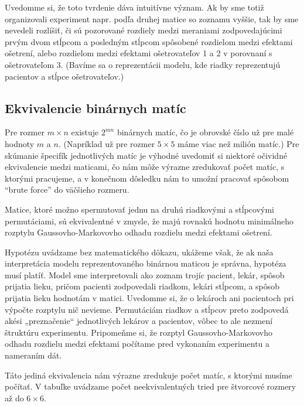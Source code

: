 Uvedomme si, že toto tvrdenie dáva intuitívne význam. Ak by sme totiž organizovali experiment napr. podľa druhej matice so zoznamu vyššie, 
tak by sme nevedeli rozlíšiť, či sú pozorované rozdiely medzi meraniami zodpovedajúcimi prvým dvom stĺpcom a posledným stĺpcom spôsobené rozdielom medzi efektami ošetrení, 
alebo rozdielom medzi efektami ošetrovateľov 1 a 2 v porovnaní s ošetrovateľom 3. (Bavíme sa o reprezentácii modelu, kde riadky reprezentujú pacientov a stĺpce ošetrovateľov.)

\subsection{Ekvivalencie binárnych matíc}

Pre rozmer $m \times n$ existuje $2^{mn}$ binárnych matíc, čo je obrovské číslo už pre malé hodnoty $m$ a $n$.
(Napríklad už pre rozmer $5 \times 5$ máme viac než milión matíc.)
Pre skúmanie špecifík jednotlivých matíc je výhodné uvedomiť si niektoré očividné ekvivalencie medzi maticami, 
čo nám môže výrazne zredukovať počet matíc, s ktorými pracujeme,
 a v konečnom dôsledku nám to umožní pracovať spôsobom “brute force” do väčšieho rozmeru.

\begin{hypoteza}

Matice, ktoré možno spermutovať jednu na druhú riadkovými a stĺpcovými permutáciami, sú ekvivalentné v zmysle, 
že majú rovnakú hodnotu minimálneho rozptylu Gaussovho-Markovovho odhadu rozdielu medzi efektami ošetrení.

\end{hypoteza}

Hypotézu uvádzame bez matematického dôkazu, ukážeme však, že ak naša interpretácia modelu reprezentovaného binárnou maticou je správna,
hypotéza musí platíť. Model sme interpretovali ako zoznam trojíc pacient, lekár, spôsob prijatia lieku, 
pričom pacienti zodpovedali riadkom, lekári stĺpcom, a spôsob prijatia lieku hodnotám v matici. 
Uvedomme si, že o lekároch ani pacientoch pri výpočte rozptylu nič nevieme. 
Permutáciám riadkov a stĺpcov preto zodpovedá akési „preznačenie“ jednotlivých lekárov a pacientov, 
vôbec to ale nezmení štruktúru experimentu. Pripomeňme si, že rozptyl Gaussovho-Markovovho odhadu rozdielu medzi efektami
počítame pred vykonaním experimentu a nameraním dát.

Táto jediná ekvivalencia nám výrazne zredukuje počet matíc, s ktorými musíme počítať. 
V tabuľke uvádzame počet neekvivalentných tried pre štvorcové rozmery až do $6 \times 6$.


